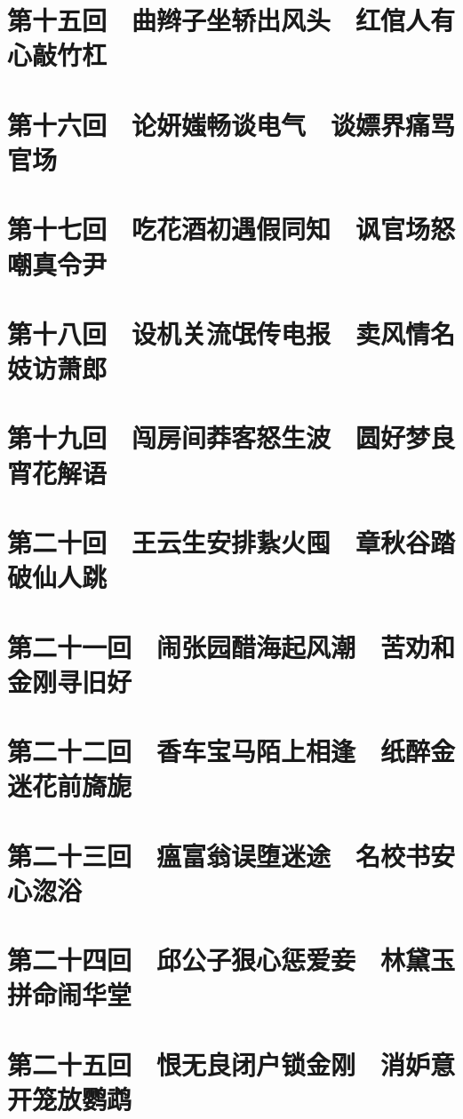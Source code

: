 \documentclass[12pt,UTF8]{ctexbook}
\begin{document}
\chapter{第十五回　曲辫子坐轿出风头　红倌人有心敲竹杠}

\chapter{第十六回　论妍媸畅谈电气　谈嫖界痛骂官场}

\chapter{第十七回　吃花酒初遇假同知　讽官场怒嘲真令尹}

\chapter{第十八回　设机关流氓传电报　卖风情名妓访萧郎}

\chapter{第十九回　闯房间莽客怒生波　圆好梦良宵花解语}

\chapter{第二十回　王云生安排紥火囤　章秋谷踏破仙人跳}

\chapter{第二十一回　闹张园醋海起风潮　苦劝和金刚寻旧好}

\chapter{第二十二回　香车宝马陌上相逢　纸醉金迷花前旖旎}

\chapter{第二十三回　瘟富翁误堕迷途　名校书安心淴浴}

\chapter{第二十四回　邱公子狠心惩爱妾　林黛玉拼命闹华堂}

\chapter{第二十五回　恨无良闭户锁金刚　消妒意开笼放鹦鹉}
\end{document}
